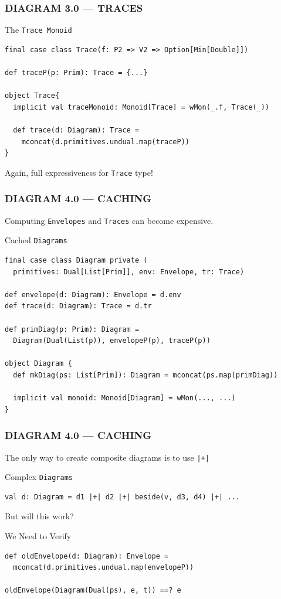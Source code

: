 \documentclass{beamer}
\begin{document}
\begin{frame}[fragile] \frametitle{DIAGRAM 3.0 --- TRACES}
  \begin{block}{The \texttt{Trace Monoid}}
  \begin{lstlisting}
final case class Trace(f: P2 => V2 => Option[Min[Double]])

def traceP(p: Prim): Trace = {...}

object Trace{
  implicit val traceMonoid: Monoid[Trace] = wMon(_.f, Trace(_))

  def trace(d: Diagram): Trace =
    mconcat(d.primitives.undual.map(traceP))
}
  \end{lstlisting}
  \end{block}

Again, full expressiveness for \texttt{Trace} type!
\end{frame}

\begin{frame}[fragile] \frametitle{DIAGRAM 4.0 --- CACHING}
  Computing \texttt{Envelopes} and \texttt{Traces} can become expensive.

  \begin{block}{Cached \texttt{Diagrams}}
  \begin{lstlisting}
final case class Diagram private (
  primitives: Dual[List[Prim]], env: Envelope, tr: Trace)

def envelope(d: Diagram): Envelope = d.env
def trace(d: Diagram): Trace = d.tr

def primDiag(p: Prim): Diagram =
  Diagram(Dual(List(p)), envelopeP(p), traceP(p))

object Diagram {
  def mkDiag(ps: List[Prim]): Diagram = mconcat(ps.map(primDiag))

  implicit val monoid: Monoid[Diagram] = wMon(..., ...)
}
  \end{lstlisting}
  \vspace{-.5cm}
  \end{block}
\end{frame}

\begin{frame}[fragile] \frametitle{DIAGRAM 4.0 --- CACHING}
  The only way to create composite diagrams is to use \texttt{|+|}

  \begin{block}{Complex \texttt{Diagrams}}
  \begin{lstlisting}
val d: Diagram = d1 |+| d2 |+| beside(v, d3, d4) |+| ...
  \end{lstlisting}
  \end{block}
  But will this work?

  \begin{block}{We Need to Verify}
  \begin{lstlisting}
def oldEnvelope(d: Diagram): Envelope =
  mconcat(d.primitives.undual.map(envelopeP))

oldEnvelope(Diagram(Dual(ps), e, t)) ==? e
  \end{lstlisting}
  \end{block}
\end{frame}
\end{document}
